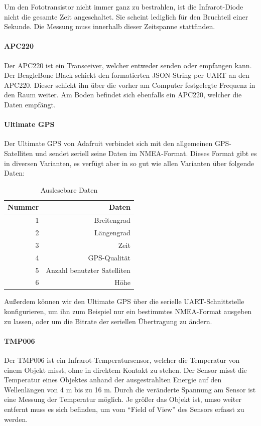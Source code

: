Um den Fototransistor nicht immer ganz zu bestrahlen, ist die Infrarot-Diode nicht die gesamte Zeit angeschaltet. Sie scheint lediglich für den Bruchteil einer Sekunde. Die Messung muss innerhalb dieser Zeitspanne stattfinden.

\paragraph{APC220}
Der APC220 ist ein Transceiver, welcher entweder senden oder empfangen kann. Der BeagleBone Black schickt den formatierten JSON-String per UART an den APC220. Dieser schickt ihn über die vorher am Computer festgelegte Frequenz in den Raum weiter. Am Boden befindet sich ebenfalls ein APC220, welcher die Daten empfängt.

\paragraph{Ultimate GPS}
Der Ultimate GPS von Adafruit verbindet sich mit den allgemeinen GPS-Satelliten und sendet seriell seine Daten im NMEA-Format. Dieses Format gibt es in diversen Varianten, es verfügt aber in so gut wie allen Varianten über folgende Daten:
\begin{table}[H]
  \centering
    \begin{tabular}{rr}
    \toprule
    \textbf{Nummer} & \textbf{Daten} \\
    \midrule 
    1 & Breitengrad \\
    2 & Längengrad \\
    3 & Zeit \\
    4 & GPS-Qualität \\
    5 & Anzahl benutzter Satelliten \\
    6 & Höhe \\
    \bottomrule
    \end{tabular}
    \caption{Auslesebare Daten}
\end{table}

Außerdem können wir den Ultimate GPS über die serielle UART-Schnittstelle konfigurieren, um ihn zum Beispiel nur ein bestimmtes NMEA-Format ausgeben zu lassen, oder um die Bitrate der seriellen Übertragung zu ändern.

\paragraph{TMP006}
Der TMP006 ist ein Infrarot-Temperatursensor, welcher die Temperatur von einem Objekt misst, ohne in direktem Kontakt zu stehen. Der Sensor misst die Temperatur eines Objektes anhand der ausgestrahlten Energie auf den Wellenlängen von 4 \textmu m bis zu 16 \textmu m. Durch die veränderte Spannung am Sensor ist eine Messung der Temperatur möglich. Je größer das Objekt ist, umso weiter entfernt muss es sich befinden, um vom ``Field of View'' des Sensors erfasst zu werden.

